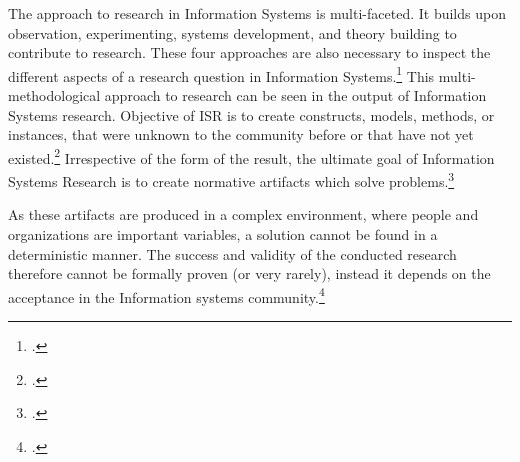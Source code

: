 The approach to research in Information Systems is multi-faceted. It builds upon observation, experimenting, systems development, and theory building to contribute to research. These four approaches are also necessary to inspect the different aspects of a research question in Information Systems.\footcite[Cf.][p.86]{NunamakerSystemsdevelopmentInformation1991} This multi-methodological approach to research can be seen in the output of Information Systems research. Objective of ISR is to create constructs, models, methods, or instances, that were unknown to the community before or that have not yet existed.\footcites[Cf.][p.12]{OsterleGestaltungsorientierteWirtschaftsinformatikPladoyer2010}[cf.][p.130]{ThomasBekannteundweniger2014} 
Irrespective of the form of the result, the ultimate goal of Information Systems Research is to create normative artifacts which solve problems.\footcite[Cf.][p.130]{ThomasBekannteundweniger2014}

As these artifacts are produced in a complex environment, where people and organizations are important variables, a solution cannot be found in a deterministic manner. The success and validity of the conducted research therefore cannot be formally proven (or very rarely), instead it depends on the acceptance in the Information systems community.\footcite[Cf.][p.671]{OsterleMemorandumzurgestaltungsorientierten2010}

